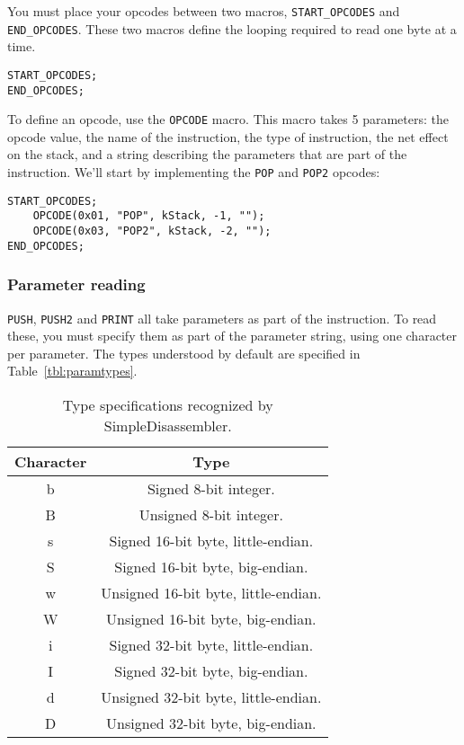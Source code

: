 You must place your opcodes between two macros, \verb+START_OPCODES+ and \verb+END_OPCODES+. These two macros define the looping required to read one byte at a time.

\begin{C++}
\begin{lstlisting}
START_OPCODES;
END_OPCODES;
\end{lstlisting}
\end{C++}

To define an opcode, use the \verb+OPCODE+ macro. This macro takes 5 parameters: the opcode value, the name of the instruction, the type of instruction, the net effect on the stack, and a string describing the parameters that are part of the instruction. We'll start by implementing the \verb+POP+ and \verb+POP2+ opcodes:

\begin{C++}
\begin{lstlisting}
START_OPCODES;
	OPCODE(0x01, "POP", kStack, -1, "");
	OPCODE(0x03, "POP2", kStack, -2, "");
END_OPCODES;
\end{lstlisting}
\end{C++}

\subsubsection{Parameter reading}
\verb+PUSH+, \verb+PUSH2+ and \verb+PRINT+ all take parameters as part of the instruction. To read these, you must specify them as part of the parameter string, using one character per parameter. The types understood by default are specified in Table~\vref{tbl:paramtypes}.

\begin{table}[!hpbt]
\centering
\begin{tabular}{c | c}
Character & Type \\
\hline
b & Signed 8-bit integer. \\
B & Unsigned 8-bit integer. \\
s & Signed 16-bit byte, little-endian. \\
S & Signed 16-bit byte, big-endian. \\
w & Unsigned 16-bit byte, little-endian. \\
W & Unsigned 16-bit byte, big-endian. \\
i & Signed 32-bit byte, little-endian. \\
I & Signed 32-bit byte, big-endian. \\
d & Unsigned 32-bit byte, little-endian. \\
D & Unsigned 32-bit byte, big-endian. \\
\end{tabular}
\caption{Type specifications recognized by SimpleDisassembler.}
\label{tbl:paramtypes}
\end{table}

